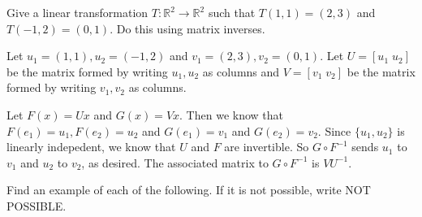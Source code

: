 \documentclass{exam}
\begin{document}
\begin{questions}
    \question
    Give a linear transformation $T:\mathbb{R}^2\to\mathbb{R}^2$ such that
    $T(1,1)=(2,3)$ and $T(-1,2)=(0,1)$. Do this using matrix inverses.
    \begin{solution}
        Let $u_1=(1,1), u_2=(-1,2)$ and $v_1=(2,3),v_2=(0,1)$. Let $U=[u_1 \;
        u_2]$ be the matrix formed by writing $u_1,u_2$ as columns and
        $V=[v_1\; v_2]$ be the matrix formed by writing $v_1,v_2$ as columns.

        Let $F(x)=Ux$ and $G(x)=Vx$. Then we know that $F(e_1)=u_1,F(e_2)=u_2$
        and $G(e_1)=v_1$ and $G(e_2)=v_2$. Since $\{u_1,u_2\}$ is linearly
        indepedent, we know that $U$ and $F$ are invertible. So $G\circ F^{-1}$
        sends $u_1$ to $v_1$ and $u_2$ to $v_2$, as desired. The associated
        matrix to $G\circ F^{-1}$ is $VU^{-1}$.
    \end{solution}

    \question
    Find an example of each of the following. If it is not possible, write NOT
    POSSIBLE.
\end{questions}
\end{document}
